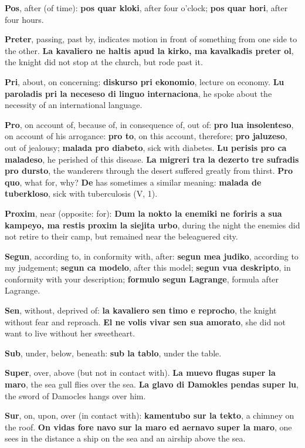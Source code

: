 \textbf{Pos}, after (of time): \textbf{pos quar kloki}, after four o'clock; \textbf{pos quar hori}, after four hours.

\textbf{Preter}, passing, past by, indicates motion in front of something from one side to the other. \textbf{La kavaliero ne haltis apud la kirko, ma kavalkadis preter ol}, the knight did not stop at the church, but rode past it.

\textbf{Pri}, about, on concerning: \textbf{diskurso pri ekonomio}, lecture on economy. \textbf{Lu paroladis pri la neceseso di linguo internaciona}, he spoke about the necessity of an international language.

\textbf{Pro}, on account of, because of, in consequence of, out of: \textbf{pro lua insolenteso}, on account of his arrogance: \textbf{pro to}, on this account, therefore; \textbf{pro jaluzeso}, out of jealousy; \textbf{malada pro diabeto}, sick with diabetes. \textbf{Lu perisis pro ca maladeso}, he perished of this disease. \textbf{La migreri tra la dezerto tre sufradis pro dursto}, the wanderers through the desert suffered greatly from thirst. \textbf{Pro quo}, what for, why? \textbf{De} has sometimes a similar meaning: \textbf{malada de tuberkloso}, sick with tuberculosis (V, 1).

\textbf{Proxim}, near (opposite: for): \textbf{Dum la nokto la enemiki ne foriris a sua kampeyo, ma restis proxim la siejita urbo}, during the night the enemies did not retire to their camp, but remained near the beleaguered city.

\textbf{Segun}, according to, in conformity with, after: \textbf{segun mea judiko}, according to my judgement; \textbf{segun ca modelo}, after this model; \textbf{segun vua deskripto}, in conformity with your description; \textbf{formulo segun Lagrange}, formula after Lagrange.

\textbf{Sen}, without, deprived of: \textbf{la kavaliero sen timo e reprocho}, the knight without fear and reproach. \textbf{El ne volis vivar sen sua amorato}, she did not want to live without her sweetheart.

\textbf{Sub}, under, below, beneath: \textbf{sub la tablo}, under the table.

\textbf{Super}, over, above (but not in contact with). \textbf{La muevo flugas super la maro}, the sea gull flies over the sea. \textbf{La glavo di Damokles pendas super lu}, the sword of Damocles hangs over him.

\textbf{Sur}, on, upon, over (in contact with): \textbf{kamentubo sur la tekto}, a chimney on the roof. \textbf{On vidas fore navo sur la maro ed aernavo super la maro}, one sees in the distance a ship on the sea and an airship above the sea.

